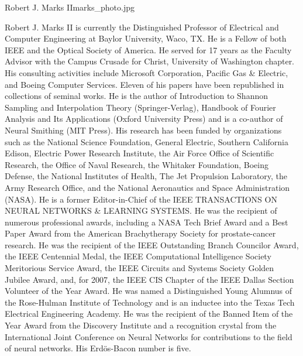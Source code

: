 \begin{authorbio}{Robert J. Marks II}{marks_photo.jpg}

Robert J. Marks II is currently the Distinguished Professor of Electrical and Computer Engineering 
at Baylor University, Waco, TX. He is a Fellow of both IEEE and the Optical Society
of America. He served for 17 years as the Faculty Advisor with the Campus Crusade for Christ,
University of Washington chapter. His consulting activities include Microsoft Corporation, Pacific
Gas \& Electric, and Boeing Computer Services. Eleven of his papers have been republished in collections 
of seminal works. He is the author of Introduction to Shannon Sampling and Interpolation
Theory (Springer-Verlag), Handbook of Fourier Analysis and Its Applications (Oxford University
Press) and is a co-author of Neural Smithing (MIT Press). His research has been funded by organizations 
such as the National Science Foundation, General Electric, Southern California Edison,
Electric Power Research Institute, the Air Force Office of Scientific Research, the Office of Naval
Research, the Whitaker Foundation, Boeing Defense, the National Institutes of Health, The Jet
Propulsion Laboratory, the Army Research Office, and the National Aeronautics and Space Administration 
(NASA). He is a former Editor-in-Chief of the IEEE TRANSACTIONS ON NEURAL
NETWORKS \& LEARNING SYSTEMS. He was the recipient of numerous professional awards,
including a NASA Tech Brief Award and a Best Paper Award from the American Brachytherapy
Society for prostate-cancer research. He was the recipient of the IEEE Outstanding Branch Councilor 
Award, the IEEE Centennial Medal, the IEEE Computational Intelligence Society Meritorious
Service Award, the IEEE Circuits and Systems Society Golden Jubilee Award, and, for 2007, the
IEEE CIS Chapter of the IEEE Dallas Section Volunteer of the Year Award. He was named a
Distinguished Young Alumnus of the Rose-Hulman Institute of Technology and is an inductee into
the Texas Tech Electrical Engineering Academy. He was the recipient of the Banned Item of the
Year Award from the Discovery Institute and a recognition crystal from the International Joint
Conference on Neural Networks for contributions to the field of neural networks. His Erd\"{o}s-Bacon
number is five.
\end{authorbio}
